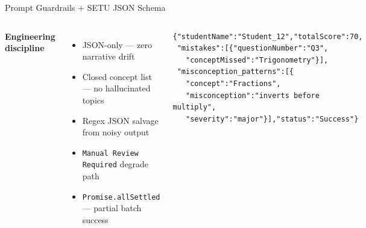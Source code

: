 \documentclass[aspectratio=169,10pt]{beamer}
\begin{document}
\begin{frame}{Prompt Guardrails + SETU JSON Schema}
  \begin{columns}
    \footnotesize\textbf{Engineering discipline}
    \begin{itemize}\setlength\itemsep{0.12em}
      \item JSON-only — zero narrative drift
      \item Closed concept list — no hallucinated topics
      \item Regex JSON salvage from noisy output
      \item \texttt{Manual Review Required} degrade path
      \item \texttt{Promise.allSettled} — partial batch success
    \end{itemize}

    \begin{tcolorbox}[colback=SSSlate!4,colframe=SSSlate,arc=6pt,title=\scriptsize Grading output (actual schema)]
      \begin{lstlisting}[style=json]
{"studentName":"Student_12","totalScore":70,
 "mistakes":[{"questionNumber":"Q3",
   "conceptMissed":"Trigonometry"}],
 "misconception_patterns":[{
   "concept":"Fractions",
   "misconception":"inverts before multiply",
   "severity":"major"}],"status":"Success"}
      \end{lstlisting}
    \end{tcolorbox}
  \end{columns}
\end{frame}
\end{document}
